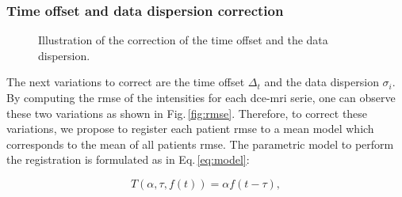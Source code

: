 \subsubsection{Time offset and data dispersion correction}

\begin{figure}
  \centering
  \hspace*{\fill}
   \hfill
  \hspace*{\fill}
  \caption{Illustration of the correction of the time offset and the data dispersion.}
  \label{fig:curveal}
\end{figure}

The next variations to correct are the time offset $\Delta_t$ and the data dispersion $\sigma_i$.
By computing the \ac{rmse} of the intensities for each \ac{dce}-\ac{mri} serie, one can observe these two variations as shown in Fig.\,\ref{fig:rmse}.
Therefore, to correct these variations, we propose to register each patient \ac{rmse} to a mean model which corresponds to the mean of all patients \ac{rmse}.
The parametric model to perform the registration is formulated as in Eq.\,\eqref{eq:model}:

\begin{equation}
  T(\alpha, \tau, f(t)) = \alpha f(t - \tau) ,
  \label{eq:model}
\end{equation}

